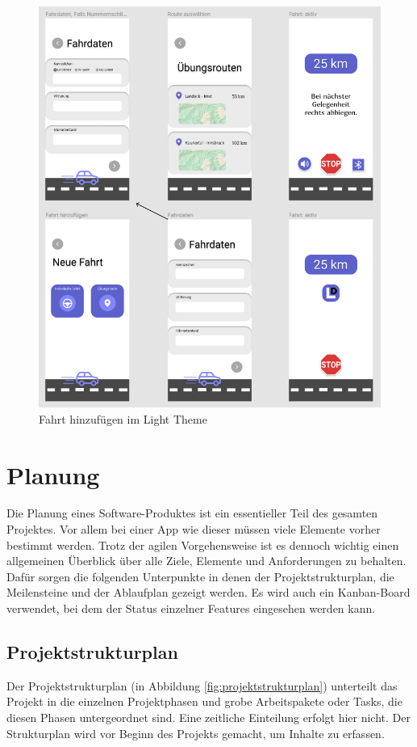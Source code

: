 \begin{figure}[H]
	\centering
	\includegraphics[width=15cm]{figures/mockup3.png}
	\caption{Fahrt hinzufügen im Light Theme}
	\label{fig:mockup3}
\end{figure}

\section{Planung}
Die Planung eines Software-Produktes ist ein essentieller Teil des gesamten Projektes. Vor allem bei einer App wie dieser müssen viele Elemente vorher bestimmt werden. Trotz der agilen Vorgehensweise ist es dennoch wichtig einen allgemeinen Überblick über alle Ziele, Elemente und Anforderungen zu behalten. Dafür sorgen die folgenden Unterpunkte in denen der Projektstrukturplan, die Meilensteine und der Ablaufplan gezeigt werden. Es wird auch ein Kanban-Board verwendet, bei dem der Status einzelner Features eingesehen werden kann.

\subsection{Projektstrukturplan}
Der Projektstrukturplan (in Abbildung \ref{fig:projektstrukturplan}) unterteilt das Projekt in die einzelnen Projektphasen und grobe Arbeitspakete oder Tasks, die diesen Phasen untergeordnet sind. Eine zeitliche Einteilung erfolgt hier nicht. Der Strukturplan wird vor Beginn des Projekts gemacht, um Inhalte zu erfassen.

